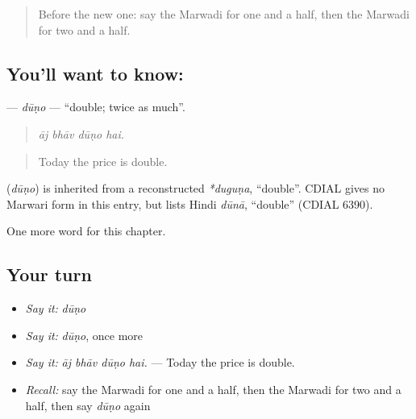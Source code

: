 \label{lesson:MW-C212-duno}



\begin{quote}
Before the new one: say the Marwadi for one and a half, then the Marwadi for two and a half.
\end{quote}

\subsection*{You'll want to know: }
\textbf{} — \emph{dūṇo} — \textquotedblleft{}double; twice as much\textquotedblright{}.

\begin{quote}
   
\end{quote}

\begin{quote}
\emph{āj bhāv dūṇo hai.}
\end{quote}

\begin{quote}
Today the price is double.
\end{quote}

\begin{cousinweb}
\textbf{} (\emph{dūṇo}) is inherited from a reconstructed \emph{*duguṇa}, \textquotedblleft{}double\textquotedblright{}. CDIAL gives no Marwari form in this entry, but lists Hindi \emph{dūnā}, \textquotedblleft{}double\textquotedblright{} (CDIAL 6390).
\end{cousinweb}

\begin{grammarlens}[title={What you've built}]
One more word for this chapter.
\end{grammarlens}

\subsection*{Your turn}
\begin{itemize}
\raggedright
  \item \emph{Say it:} \emph{dūṇo}
  \item \emph{Say it:} \emph{dūṇo}, once more
  \item \emph{Say it:} \emph{āj bhāv dūṇo hai.} — Today the price is double.
  \item \emph{Recall:} say the Marwadi for one and a half, then the Marwadi for two and a half, then say \emph{dūṇo} again
\end{itemize}

